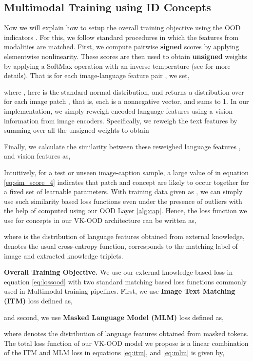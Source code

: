 \documentclass{article}
\begin{document}
\subsection{Multimodal Training using ID Concepts}  Now we will explain how to setup the overall training objective using the OOD indicators . For this, we follow standard procedures in which the features from modalities are matched. First, we compute pairwise {\bf signed} scores  by applying elementwise nonlinearity. These scores  are  then used to obtain    {\bf unsigned} weights  by  applying a SoftMax operation  with an inverse temperature   (see \cite{chorowski2015attention} for more details).  That is for each image-language feature pair , we set,

where  ,  here  is the standard normal distribution, and  returns a distribution over  for each image patch , that is, each  is a nonnegative vector, and sums to 1. In our implementation, we simply  reweigh encoded language features using  a vision information from image encoders. Specifically, we  reweigh the text features  by summing over all the unsigned weights to obtain 

Finally, we calculate the similarity between  these reweighed language features , and vision features  as,

Intuitively, for a test or unseen image-caption sample, a large value of  in equation \eqref{eq:sim_score_4} indicates that patch  and concept  are likely to occur together for a fixed set of learnable parameters. With training data given as , we can simply use  such similarity based loss functions even under the presence of outliers with the help of  computed using our OOD Layer \ref{alg:cap}.  Hence, the loss function we use for concepts   in our VK-OOD architecture can be written as,

where  is the distribution of language features obtained from external knowledge,  denotes the usual cross-entropy function,  corresponds to the matching label of image and extracted knowledge triplets. 

{\bf Overall Training Objective.} We use our external knowledge based loss in equation \eqref{eq:lossood} with two standard matching based loss functions commonly used in Multimodal training pipelines. First, we use {\bf Image Text Matching (ITM)} loss  defined as,

and second, we use {\bf Masked Language Model (MLM)} loss   defined as,

where  denotes the distribution of language features obtained from masked tokens. The total loss function  of our VK-OOD model we propose  is a linear combination of  the ITM and MLM loss  in equations  \eqref{eq:itm}, and \eqref{eq:mlm} is given by, 
\end{document}
